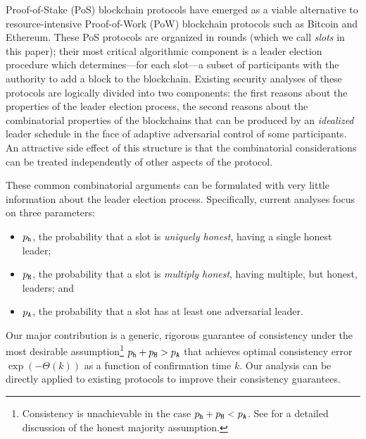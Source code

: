 Proof-of-Stake (PoS) blockchain protocols have emerged as a viable
alternative to resource-intensive Proof-of-Work (PoW) blockchain
protocols such as Bitcoin and Ethereum. These PoS protocols are
organized in rounds (which we call \emph{slots} in this paper); their
most critical algorithmic component is a leader election procedure
which determines---for each slot---a subset of participants with the
authority to add a block to the blockchain. Existing security analyses
of these protocols are logically divided into two components: the
first reasons about the properties of the leader election process, the
second reasons about the combinatorial properties of the blockchains
that can be produced by an \emph{idealized} leader schedule in the
face of adaptive adversarial control of some participants. An
attractive side effect of this structure is that the combinatorial
considerations can be treated independently of other aspects of the
protocol. 

These common combinatorial arguments can be formulated with very
little information about the leader election process.  Specifically,
current analyses focus on three parameters:
\begin{itemize}
\item $p_{\mathtt{h}}$, the probability that a slot is \emph{uniquely honest}, having a single honest leader;
\item $p_{\mathtt{H}}$, the probability that a slot is \emph{multiply honest}, having multiple, but honest,
  leaders; and
\item $p_{\mathtt{A}}$, the probability that a slot has at least one adversarial leader.
\end{itemize}
Our major contribution is a generic, rigorous guarantee of consistency
under the most desirable assumption\footnote{ 
  Consistency is unachievable in the case $p_{\mathtt{h}} + p_{\mathtt{H}} < p_{\mathtt{A}}$.
  See \cite{GK18} for a detailed discussion of the honest majority
  assumption. } $p_{\mathtt{h}} + p_{\mathtt{H}} > p_{\mathtt{A}}$ that achieves optimal consistency
error $\exp(-\Theta(k))$ as a function of confirmation time $k$. Our
analysis can be directly applied to existing protocols to improve
their consistency guarantees.

